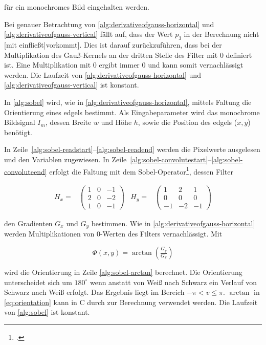 für ein monochromes Bild eingehalten werden.

Bei genauer Betrachtung von \autoref{alg:derivativeofgauss-horizontal} und \autoref{alg:derivativeofgauss-vertical}
 fällt auf, dass der Wert $p_3$ in der Berechnung nicht [mit einfließt|vorkommt]. Dies ist darauf zurückzuführen, dass bei der
 Multiplikation des Gauß-Kernels an der dritten Stelle des Filter mit $0$ definiert ist. Eine Multiplikation mit $0$
 ergibt immer $0$ und kann somit vernachlässigt werden. Die Laufzeit von \autoref{alg:derivativeofgauss-horizontal} und
 \autoref{alg:derivativeofgauss-vertical} ist konstant.

In \autoref{alg:sobel} wird, wie in \autoref{alg:derivativeofgauss-horizontal}, mittels Faltung die Orientierung eines
 \glspl{edgel} bestimmt. Als Eingabeparameter wird das monochrome Bildsignal $I_m$, dessen Breite $w$ und Höhe $h$,
 sowie die Position des \glspl{edgel} ($x,y$) benötigt.



In Zeile~\ref{alg:sobel-readstart}--\ref{alg:sobel-readend} werden die Pixelwerte ausgelesen und den Variablen
 zugewiesen. In Zeile~\ref{alg:sobel-convolutestart}--\ref{alg:sobel-convoluteend} erfolgt die Faltung mit dem
 Sobel-Operator\footcite[Vgl.][S.~120--123]{burger05}, dessen Filter

\begin{subequations}
\begin{align}
	H_x =&
	\begin{pmatrix}
		1& 0& -1\\
		2& 0& -2\\
		1& 0& -1
	\end{pmatrix}
\end{align}
\begin{align}
	H_y =&
	\begin{pmatrix}
		1& 2& 1\\
		0& 0& 0\\
		-1& -2& -1
	\end{pmatrix}
\end{align}
\end{subequations}

den Gradienten $G_x$ und $G_y$ bestimmen. Wie in \autoref{alg:derivativeofgauss-horizontal} werden Multiplikationen von
 $0$-Werten des Filters vernachlässigt. Mit

\begin{equation}
	\label{eq:orientation}
	\Phi(x,y) = \arctan{\left(\tfrac{G_y}{G_x}\right)}
\end{equation}

wird die Orientierung in Zeile \autoref{alg:sobel-arctan} berechnet. Die Orientierung unterscheidet sich um $180^\circ$
 wenn anstatt von Weiß nach Schwarz ein Verlauf von Schwarz nach Weiß erfolgt. Das Ergebnis liegt im Bereich
 $-\pi < v \leq \pi$. $\arctan$ in \autoref{eq:orientation} kann in C durch  zur Berechnung verwendet
 werden. Die Laufzeit von \autoref{alg:sobel} ist konstant.




